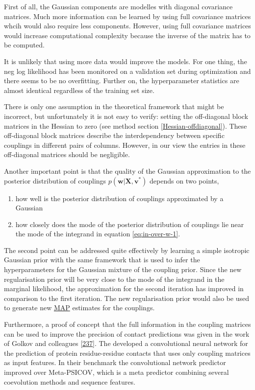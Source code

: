 \documentclass[11pt,a4paper,twoside]{book}
\providecommand{\tightlist}{%
  \setlength{\itemsep}{0pt}\setlength{\parskip}{0pt}}
\renewcommand{\v}{\mathbf{v}}
\newcommand{\w}{\mathbf{w}}
\newcommand{\X}{\mathbf{X}}
\theoremstyle{definition}
\theoremstyle{definition}
\theoremstyle{remark}
\begin{document}
First of all, the Gaussian components are modelles with diagonal
covariance matrices. Much more information can be learned by using full
covariance matrices whcih would also require less components. However,
using full covariance matrices would increase computational complexity
because the inverse of the matrix has to be computed.

It is unlikely that using more data would improve the models. For one
thing, the neg log likelihood has been monitored on a validation set
during optimization and there seems to be no overfitting. Further on,
the hyperparameter statistics are almost identical regardless of the
training set size.

There is only one assumption in the theoretical framework that might be
incorrect, but unfortunately it is not easy to verify: setting the
off-diagonal block matrices in the Hessian to zero (see method section
\ref{Hessian-offdiagonal}). These off-diagonal block matrices describe
the interdependency between specific couplings in different pairs of
columns. However, in our view the entries in these off-diagonal matrices
should be negligible.

Another important point is that the quality of the Gaussian
approximation to the posterior distribution of couplings
\(p(\w | \X , \v^*)\) depends on two points,

\begin{enumerate}
\def\labelenumi{\arabic{enumi}.}
\tightlist
\item
  how well is the posterior distribution of couplings approximated by a
  Gaussian
\item
  how closely does the mode of the posterior distribution of couplings
  lie near the mode of the integrand in equation \eqref{eq:in-over-w-1}.
\end{enumerate}

The second point can be addressed quite effectively by learning a simple
isotropic Gaussian prior with the same framework that is used to infer
the hyperparameters for the Gaussian mixture of the coupling prior.
Since the new regularisation prior will be very close to the mode of the
integrand in the marginal likelihood, the approximation for the second
iteration has improved in comparison to the first iteration. The new
regularisation prior would also be used to generate new
\protect\hyperlink{abbrev}{MAP} estimates for the couplings.

Furthermore, a proof of concept that the full information in the
coupling matrices can be used to improve the precision of contact
predictions was given in the work of Golkov and colleagues
{[}\protect\hyperlink{ref-Golkov2016a}{237}{]}. The developed a
convolutional neural network for the prediction of protein
residue-residue contacts that uses only coupling matrices as input
features. In their benchmark the convolutional network predictor
improved over Meta-PSICOV, which is a meta predictor combining several
coevolution methods and sequence features.
\end{document}
